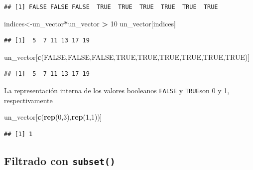\documentclass[
]{book}
\newenvironment{Shaded}{\begin{snugshade}}{\end{snugshade}}
\newcommand{\ConstantTok}[1]{\textcolor[rgb]{0.56,0.35,0.01}{#1}}
\newcommand{\DecValTok}[1]{\textcolor[rgb]{0.00,0.00,0.81}{#1}}
\newcommand{\FunctionTok}[1]{\textcolor[rgb]{0.13,0.29,0.53}{\textbf{#1}}}
\newcommand{\NormalTok}[1]{#1}
\newcommand{\OtherTok}[1]{\textcolor[rgb]{0.56,0.35,0.01}{#1}}
\newcommand{\SpecialCharTok}[1]{\textcolor[rgb]{0.81,0.36,0.00}{\textbf{#1}}}
\begin{document}
\begin{verbatim}
## [1] FALSE FALSE FALSE  TRUE  TRUE  TRUE  TRUE  TRUE  TRUE
\end{verbatim}

\begin{Shaded}
\begin{Highlighting}[]
\NormalTok{indices}\OtherTok{\textless{}{-}}\NormalTok{un\_vector}\SpecialCharTok{*}\NormalTok{un\_vector }\SpecialCharTok{\textgreater{}} \DecValTok{10} 
\NormalTok{un\_vector[indices]}
\end{Highlighting}
\end{Shaded}

\begin{verbatim}
## [1]  5  7 11 13 17 19
\end{verbatim}

\begin{Shaded}
\begin{Highlighting}[]
\NormalTok{un\_vector[}\FunctionTok{c}\NormalTok{(}\ConstantTok{FALSE}\NormalTok{,}\ConstantTok{FALSE}\NormalTok{,}\ConstantTok{FALSE}\NormalTok{,}\ConstantTok{TRUE}\NormalTok{,}\ConstantTok{TRUE}\NormalTok{,}\ConstantTok{TRUE}\NormalTok{,}\ConstantTok{TRUE}\NormalTok{,}\ConstantTok{TRUE}\NormalTok{,}\ConstantTok{TRUE}\NormalTok{)]}
\end{Highlighting}
\end{Shaded}

\begin{verbatim}
## [1]  5  7 11 13 17 19
\end{verbatim}

La representación interna de los valores booleanos \texttt{FALSE} y \texttt{TRUE}son 0 y 1, respectivamente

\begin{Shaded}
\begin{Highlighting}[]
\NormalTok{un\_vector[}\FunctionTok{c}\NormalTok{(}\FunctionTok{rep}\NormalTok{(}\DecValTok{0}\NormalTok{,}\DecValTok{3}\NormalTok{),}\FunctionTok{rep}\NormalTok{(}\DecValTok{1}\NormalTok{,}\DecValTok{1}\NormalTok{))]}
\end{Highlighting}
\end{Shaded}

\begin{verbatim}
## [1] 1
\end{verbatim}

\subsection{\texorpdfstring{Filtrado con \texttt{subset()}}{Filtrado con subset()}}\label{filtrado-con-subset}
\end{document}
